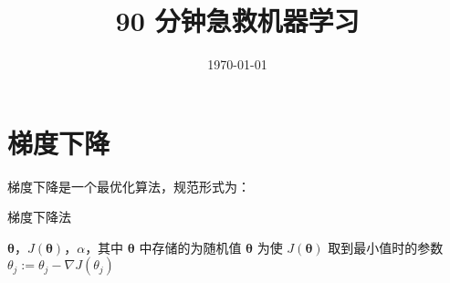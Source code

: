 \documentclass[normal, cyan, en]{elegantnote}
\title{90 分钟急救机器学习}
\date{\today}
\begin{document}
\maketitle
\tableofcontents
\newpage

\section{梯度下降}
梯度下降是一个最优化算法，规范形式为：

\begin{algorithm}[H]
    \renewcommand{\algorithmicrequire}{\textbf{Input:}}
	\renewcommand{\algorithmicensure}{\textbf{Output:}}
    \caption{梯度下降法}
    \begin{algorithmic}[1]
        \REQUIRE $\boldsymbol{\theta}$，$J(\boldsymbol{\theta})$，$\alpha$，其中 $\boldsymbol{\theta}$ 中存储的为随机值
        \ENSURE $\boldsymbol{\theta}$ 为使 $J(\boldsymbol{\theta})$ 取到最小值时的参数
                \STATE $\theta_j := \theta_j - \nabla J(\theta_j)$
            \ENDFOR
        \ENDWHILE
    \end{algorithmic}
\end{algorithm}






















\end{document}
